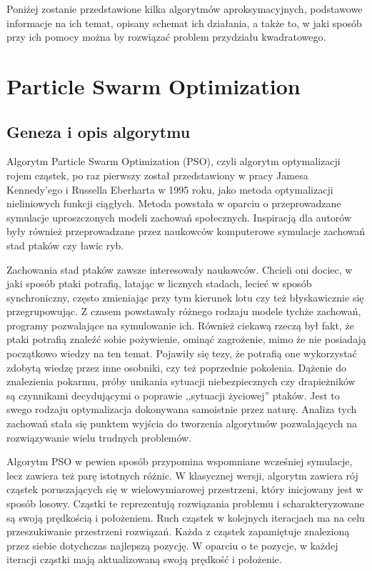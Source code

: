 Poniżej zostanie przedstawione kilka algorytmów aproksymacyjnych, podstawowe informacje na ich temat, opisany schemat ich działania, a także to, w jaki sposób przy ich pomocy można by rozwiązać problem przydziału kwadratowego.

\section{Particle Swarm Optimization}
\label{sec:PSO}
\subsection{Geneza i opis algorytmu} 
Algorytm Particle Swarm Optimization (PSO), czyli algorytm optymalizacji rojem cząstek, po raz pierwszy został przedstawiony w pracy Jamesa Kennedy'ego i Russella Eberharta w 1995 roku, jako metoda optymalizacji nieliniowych funkcji ciągłych. Metoda powstała w oparciu o przeprowadzane symulacje uproszczonych modeli zachowań społecznych. Inspiracją dla autorów były również  przeprowadzane przez naukowców komputerowe symulacje zachowań stad ptaków czy ławic ryb.

Zachowania stad ptaków zawsze interesowały naukowców. Chcieli oni dociec, w jaki sposób ptaki potrafią, latając w licznych stadach, lecieć w sposób synchroniczny, często zmieniając przy tym kierunek lotu czy też błyskawicznie się przegrupowując. Z czasem powstawały różnego rodzaju modele tychże zachowań, programy pozwalające na symulowanie ich. Również ciekawą rzeczą był fakt, że ptaki potrafią znaleźć sobie pożywienie, ominąć zagrożenie, mimo że nie posiadają początkowo wiedzy na ten temat. Pojawiły się tezy, że potrafią one wykorzystać zdobytą wiedzę przez inne osobniki, czy też poprzednie pokolenia. Dążenie do znalezienia pokarmu, próby unikania sytuacji niebezpiecznych czy drapieżników są czynnikami decydującymi o poprawie ,,sytuacji życiowej'' ptaków. Jest to swego rodzaju optymalizacja dokonywana samoistnie przez naturę. Analiza tych zachowań stała się punktem wyjścia do tworzenia algorytmów pozwalających na rozwiązywanie wielu trudnych problemów.

Algorytm PSO w pewien sposób przypomina wspomniane wcześniej symulacje, lecz zawiera też parę istotnych różnic. W klasycznej wersji, algorytm zawiera rój cząstek poruszających się w wielowymiarowej przestrzeni, który inicjowany jest w sposób losowy. Cząstki te reprezentują rozwiązania problemu i scharakteryzowane są swoją prędkością i położeniem. Ruch cząstek w kolejnych iteracjach ma na celu przeszukiwanie przestrzeni rozwiązań. Każda z cząstek zapamiętuje znalezioną przez siebie dotychczas najlepszą pozycję. W oparciu o te pozycje, w każdej iteracji cząstki mają aktualizowaną swoją prędkość i położenie.

